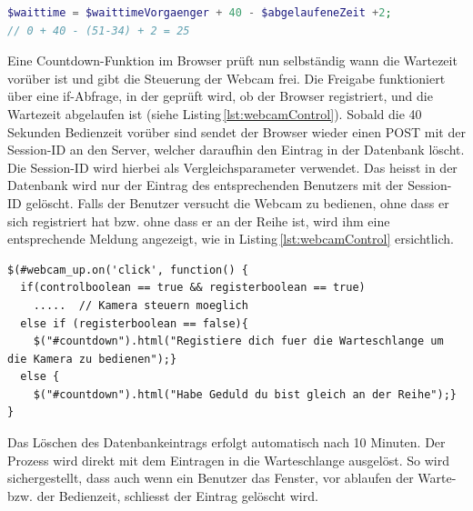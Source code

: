 \vspace{3mm}
\begin{lstlisting}[label=lst:wartezeit,caption=Berechnung der Wartezeit, language=PHP, style=PHP]
$waittime = $waittimeVorgaenger + 40 - $abgelaufeneZeit +2;
// 0 + 40 - (51-34) + 2 = 25
\end{lstlisting}
\vspace{3mm}

\noindent
Eine Countdown-Funktion im Browser prüft nun selbständig wann die Wartezeit vorüber ist und gibt die Steuerung der Webcam frei. Die Freigabe funktioniert über eine if-Abfrage, in der geprüft wird, ob der Browser registriert, und die Wartezeit abgelaufen ist (siehe Listing\,\ref{lst:webcamControl}).
Sobald die 40\,Sekunden Bedienzeit vorüber sind sendet der Browser wieder einen POST mit der Session-ID an den Server, welcher daraufhin den Eintrag in der Datenbank löscht. Die Session-ID wird hierbei als Vergleichsparameter verwendet. Das heisst in der Datenbank wird nur der Eintrag des entsprechenden Benutzers mit der Session-ID gelöscht. Falls der Benutzer versucht die Webcam zu bedienen, ohne dass er sich registriert hat bzw. ohne dass er an der Reihe ist, wird ihm eine entsprechende Meldung angezeigt, wie in Listing\,\ref{lst:webcamControl} ersichtlich.

\vspace{3mm}
\begin{lstlisting}[label=lst:webcamControl, caption=Freigabe der Webcam-Steuerung,language=HTML5, style=htmlcssjs]
$(#webcam_up.on('click', function() {
  if(controlboolean == true && registerboolean == true)
    .....  // Kamera steuern moeglich
  else if (registerboolean == false){
    $("#countdown").html("Registiere dich fuer die Warteschlange um die Kamera zu bedienen");}
  else {
    $("#countdown").html("Habe Geduld du bist gleich an der Reihe");}
}
\end{lstlisting}
\vspace{3mm}

Das Löschen des Datenbankeintrags erfolgt automatisch nach 10 Minuten. Der Prozess wird direkt mit dem Eintragen in die Warteschlange ausgelöst. So wird sichergestellt, dass auch wenn ein Benutzer das Fenster, vor ablaufen der Warte- bzw. der Bedienzeit, schliesst der Eintrag gelöscht wird.
